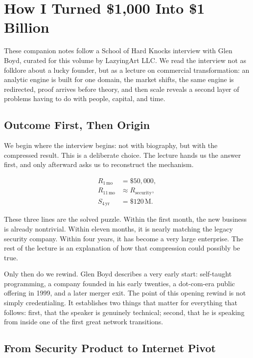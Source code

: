 \chapter{How I Turned \$1{,}000 Into \$1 Billion}

These companion notes follow a School of Hard Knocks interview with Glen Boyd, curated for this volume by LazyingArt LLC. We read the interview not as folklore about a lucky founder, but as a lecture on commercial transformation: an analytic engine is built for one domain, the market shifts, the same engine is redirected, proof arrives before theory, and then scale reveals a second layer of problems having to do with people, capital, and time.

\section{Outcome First, Then Origin}

We begin where the interview begins: not with biography, but with the compressed result. This is a deliberate choice. The lecture hands us the answer first, and only afterward asks us to reconstruct the mechanism.

\begin{align}
R_{1\,\mathrm{mo}} &= \$50{,}000,\\
R_{11\,\mathrm{mo}} &\approx R_{\mathrm{security}},\\
S_{4\,\mathrm{yr}} &= \$120\,\mathrm{M}.
\end{align}

These three lines are the solved puzzle. Within the first month, the new business is already nontrivial. Within eleven months, it is nearly matching the legacy security company. Within four years, it has become a very large enterprise. The rest of the lecture is an explanation of how that compression could possibly be true.

Only then do we rewind. Glen Boyd describes a very early start: self-taught programming, a company founded in his early twenties, a dot-com-era public offering in 1999, and a later merger exit. The point of this opening rewind is not simply credentialing. It establishes two things that matter for everything that follows: first, that the speaker is genuinely technical; second, that he is speaking from inside one of the first great network transitions.

\section{From Security Product to Internet Pivot}

